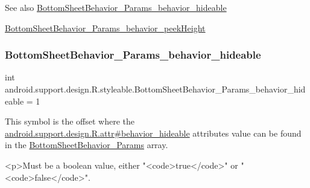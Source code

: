 \begin{DoxySeeAlso}{See also}
\hyperlink{classandroid_1_1support_1_1design_1_1R_1_1styleable_a187697693b30aa7a837dcfc348a3e86f}{Bottom\+Sheet\+Behavior\+\_\+\+Params\+\_\+behavior\+\_\+hideable} 

\hyperlink{classandroid_1_1support_1_1design_1_1R_1_1styleable_a32c296d23574cb4ecb2698c4645bbbd9}{Bottom\+Sheet\+Behavior\+\_\+\+Params\+\_\+behavior\+\_\+peek\+Height} 
\end{DoxySeeAlso}
\mbox{\label{classandroid_1_1support_1_1design_1_1R_1_1styleable_a187697693b30aa7a837dcfc348a3e86f}} 
\subsubsection{\texorpdfstring{Bottom\+Sheet\+Behavior\+\_\+\+Params\+\_\+behavior\+\_\+hideable}{BottomSheetBehavior\_Params\_behavior\_hideable}}
{\footnotesize\ttfamily int android.\+support.\+design.\+R.\+styleable.\+Bottom\+Sheet\+Behavior\+\_\+\+Params\+\_\+behavior\+\_\+hideable = 1\hspace{0.3cm}{\ttfamily [static]}}

This symbol is the offset where the \hyperlink{classandroid_1_1support_1_1design_1_1R_1_1attr_a0dd161810c2e6f6a7dd186e8d3d7d290}{android.\+support.\+design.\+R.\+attr\#behavior\+\_\+hideable} attribute\textquotesingle{}s value can be found in the \hyperlink{classandroid_1_1support_1_1design_1_1R_1_1styleable_a1eaee76086f549bf3ccdc756b449ddd4}{Bottom\+Sheet\+Behavior\+\_\+\+Params} array.

\begin{DoxyVerb}      <p>Must be a boolean value, either "<code>true</code>" or "<code>false</code>".
\end{DoxyVerb}
 

